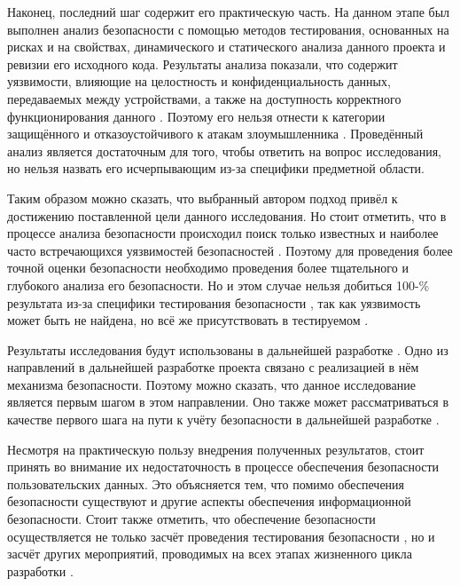 %
Наконец, последний шаг содержит его практическую часть. 
%
На данном этапе был выполнен анализ безопасности  с помощью методов тестирования, основанных на рисках и на свойствах, динамического и статического анализа данного проекта и ревизии его исходного кода. 
%
Результаты анализа показали, что  содержит уязвимости, влияющие на целостность и конфиденциальность данных, передаваемых между устройствами, а также на доступность корректного функционирования данного . 
%
Поэтому его нельзя отнести к категории защищённого и отказоустойчивого к атакам злоумышленника . 
%
Проведённый анализ является достаточным для того, чтобы ответить на вопрос исследования, но нельзя назвать его исчерпывающим из-за специфики предметной области. 

%
Таким образом можно сказать, что выбранный автором подход привёл к достижению поставленной цели данного исследования. 
%
Но стоит отметить, что в процессе анализа безопасности  происходил поиск только известных и наиболее часто встречающихся уязвимостей безопасностей . 
%
Поэтому для проведения более точной оценки безопасности  необходимо проведения более тщательного и глубокого анализа его безопасности. 
%
Но и этом случае нельзя добиться 100-\% результата из-за специфики тестирования безопасности , так как уязвимость может быть не найдена, но всё же присутствовать в тестируемом . 



%
Результаты исследования будут использованы в дальнейшей разработке . 
%
Одно из направлений в дальнейшей разработке проекта связано с реализацией в нём механизма безопасности.
%
Поэтому можно сказать, что данное исследование является первым шагом в этом направлении. 
%
Оно также может рассматриваться в качестве первого шага на пути к учёту безопасности в дальнейшей разработке .

%
Несмотря на практическую пользу внедрения полученных результатов, стоит принять во внимание их недостаточность в процессе обеспечения безопасности пользовательских данных. 
%
Это объясняется тем, что помимо обеспечения безопасности  существуют и другие аспекты обеспечения информационной безопасности. 
%
Стоит также отметить, что обеспечение безопасности  осуществляется не только засчёт проведения тестирования безопасности , но и засчёт других мероприятий, проводимых на всех этапах жизненного цикла разработки . 

